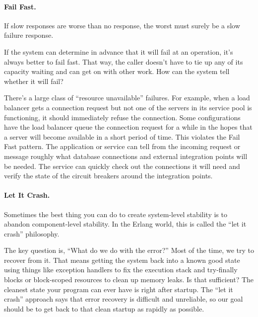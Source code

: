 \paragraph{Fail Fast.} If slow responses are worse than no response, the worst must surely be a slow failure response.

If the system can determine in advance that it will fail at an operation, it’s always better to fail fast. That way, the caller doesn’t have to tie up any of its capacity waiting and can get on with other work. How can the system tell whether it will fail?

There’s a large class of “resource unavailable” failures. For example, when a load balancer gets a connection request but not one of the servers in its service pool is functioning, it should immediately refuse the connection. Some configurations have the load balancer queue the connection request for a while in the hopes that a server will become available in a short period of time. This violates the Fail Fast pattern. The application or service can tell from the incoming request or message roughly what database connections and external integration points will be needed. The service can quickly check out the connections it will need and verify the state of the circuit breakers around the integration points.

\paragraph{Let It Crash.} Sometimes the best thing you can do to create system-level stability is to abandon component-level stability. In the Erlang world, this is called the “let it crash” philosophy.


The key question is, “What do we do with the error?” Most of the time, we try to recover from it. That means getting the system back into a known good state using things like exception handlers to fix the execution stack and try-finally blocks or block-scoped resources to clean up memory leaks. Is that sufficient? The cleanest state your program can ever have is right after startup. The “let it crash” approach says that error recovery is difficult and unreliable, so our goal should be to get back to that clean startup as rapidly as possible.

